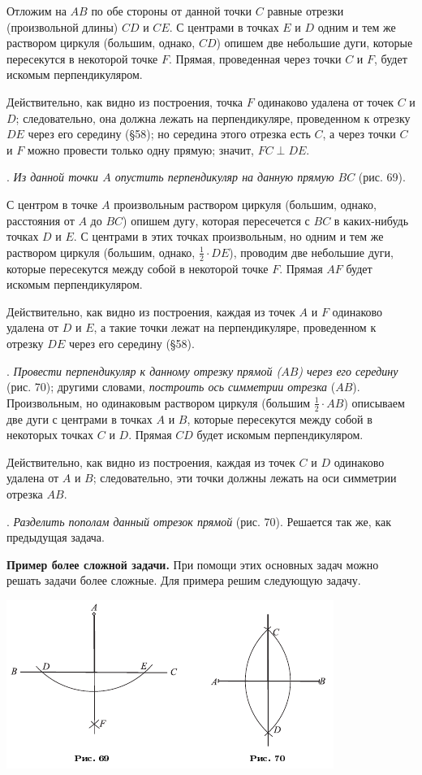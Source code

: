 \documentclass[oneside]{book}
\begin{document}
Отложим на $AB$ по обе стороны от данной точки $C$ равные отрезки (произвольной длины) $CD$ и $CE$.
С центрами в точках $E$ и $D$ одним и тем же раствором циркуля (большим, однако, $CD$) опишем две небольшие дуги, которые пересекутся в некоторой точке $F$.
Прямая, проведенная через точки $C$ и $F$, будет искомым перпендикуляром.

Действительно, как видно из построения, точка $F$ одинаково удалена от точек $C$ и $D$;
следовательно, она должна лежать на перпендикуляре, проведенном к отрезку $DE$ через его середину (§58);
но середина этого отрезка есть $C$, а через точки $C$ и $F$ можно провести только одну прямую;
значит, $FC \perp DE$.

.
\emph{Из данной точки $A$ опустить перпендикуляр на данную прямую $BC$} (рис. 69).

С центром в точке $A$ произвольным раствором циркуля (большим, однако, расстояния от $A$ до $BC$) опишем дугу, которая пересечется с $BC$ в каких-нибудь точках $D$ и $E$.
С центрами в этих точках произвольным, но одним и тем же раствором циркуля (большим, однако, $\tfrac12\cdot DE$), проводим две небольшие дуги, которые пересекутся между собой в некоторой точке $F$.
Прямая $AF$ будет искомым перпендикуляром.

Действительно, как видно из построения, каждая из точек $A$ и $F$ одинаково удалена от $D$ и $E$, а такие точки лежат на перпендикуляре, проведенном к отрезку $DE$ через его середину (§58).

.
\emph{Провести перпендикуляр к данному отрезку прямой \emph{($AB$)} через его середину} (рис. 70);
другими словами, \emph{построить ось симметрии отрезка} ($AB$).
Произвольным, но одинаковым раствором циркуля (большим $\tfrac12\cdot AB$) описываем две дуги с центрами в точках $A$ и $B$, которые пересекутся между собой в некоторых точках $C$ и $D$.
Прямая $CD$ будет искомым перпендикуляром.

Действительно, как видно из построения, каждая из точек $C$ и $D$ одинаково удалена от $A$ и $B$;
следовательно, эти точки должны лежать на оси симметрии отрезка $AB$.

.
\emph{Разделить пополам данный отрезок прямой} (рис. 70).
Решается так же, как предыдущая задача.

\textbf{Пример более сложной задачи.}
При помощи этих основных задач можно решать задачи более сложные.
Для примера решим следующую задачу.

\includegraphics{pics/ris-69-70}
\end{document}

